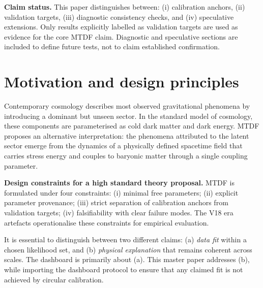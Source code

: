 \documentclass[11pt,a4paper]{article}
\begin{document}
\begin{mdframed}[linecolor=accent,linewidth=0.5pt,backgroundcolor=callout-bg,leftline=true,rightline=true,topline=true,bottomline=true,innerleftmargin=8pt,innerrightmargin=8pt,innertopmargin=6pt,innerbottommargin=6pt]
\textbf{Claim status.}
This paper distinguishes between:
(i) calibration anchors,
(ii) validation targets,
(iii) diagnostic consistency checks, and
(iv) speculative extensions.
Only results explicitly labelled as validation targets are used as evidence for the core MTDF claim. Diagnostic and speculative sections are included to define future tests, not to claim established confirmation.
\end{mdframed}


\tableofcontents

\section{Motivation and design principles}
\label{sec:sec1}
Contemporary cosmology describes most observed gravitational phenomena by introducing a dominant but unseen sector. In the standard model of cosmology, these components are parameterised as cold dark matter and dark energy. MTDF proposes an alternative interpretation: the phenomena attributed to the latent sector emerge from the dynamics of a physically defined spacetime field that carries stress energy and couples to baryonic matter through a single coupling parameter.

\begin{mdframed}[linecolor=accent,linewidth=0.5pt,backgroundcolor=callout-bg,leftline=true,rightline=true,topline=true,bottomline=true,innerleftmargin=8pt,innerrightmargin=8pt,innertopmargin=6pt,innerbottommargin=6pt]
\textbf{Design constraints for a high standard theory proposal.} MTDF is formulated under four constraints: (i) minimal free parameters; (ii) explicit parameter provenance; (iii) strict separation of calibration anchors from validation targets; (iv) falsifiability with clear failure modes. The V18 era artefacts operationalise these constraints for empirical evaluation.
\end{mdframed}

It is essential to distinguish between two different claims: (a) \emph{data fit} within a chosen likelihood set, and (b) \emph{physical explanation} that remains coherent across scales. The dashboard is primarily about (a). This master paper addresses (b), while importing the dashboard protocol to ensure that any claimed fit is not achieved by circular calibration.
\end{document}
